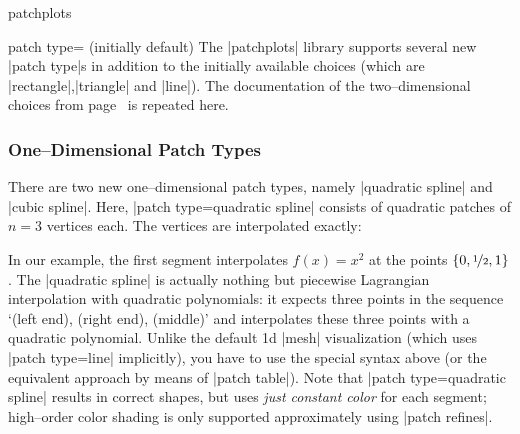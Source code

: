 {\begin{pgfplotslibrary}{patchplots}
%
\begin{pgfplotskey}{patch type= (initially default)}
	The |patchplots| library supports several new |patch type|s in addition to the initially available choices (which are |rectangle|,|triangle| and |line|). The documentation of the two--dimensional choices from page~\pageref{key:patch:type} is repeated here.

\subsubsection{One--Dimensional Patch Types}
	There are two new one--dimensional patch types, namely |quadratic spline| and |cubic spline|. Here, |patch type=quadratic spline| consists of quadratic patches of $n=3$ vertices each. The vertices are interpolated exactly:
\begin{codeexample}[]
\end{codeexample}
	\noindent In our example, the first segment interpolates $f(x)=x^2$ at the points $\{0,\nicefrac12,1\}$. The |quadratic spline| is actually nothing but piecewise Lagrangian interpolation with quadratic polynomials: it expects three points in the sequence `(left end), (right end), (middle)' and interpolates these three points with a quadratic polynomial. Unlike the default 1d |mesh| visualization (which uses |patch type=line| implicitly), you have to use the special syntax above (or the equivalent approach by means of |patch table|). Note that |patch type=quadratic spline| results in correct shapes, but uses \emph{just constant color} for each segment; high--order color shading is only supported approximately using |patch refines|.


\end{pgfplotskey}
\end{pgfplotslibrary}}
